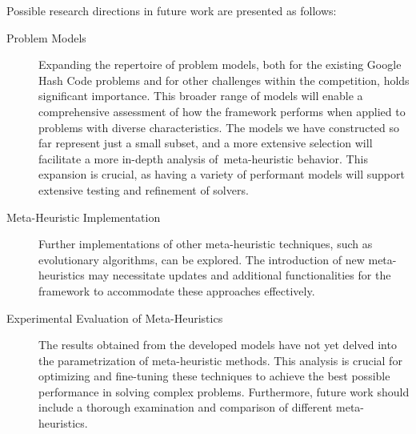 Possible research directions in future work are presented as follows:

\begin{description}
  \item[Problem Models] Expanding the repertoire of problem models, both for
    the existing Google Hash Code problems and for other challenges within the
    competition, holds significant importance. This broader range of models will
    enable a comprehensive assessment of how the framework performs when applied
    to problems with diverse characteristics. The models we have constructed so far
    represent just a small subset, and a more extensive selection will facilitate
    a more in-depth analysis of~\acrshort{meta-heuristic} behavior. This expansion is
    crucial, as having a variety of performant models will support extensive
    testing and refinement of solvers.

  \item[Meta-Heuristic Implementation] Further implementations of other
    meta-heuristic techniques, such as evolutionary algorithms, can be
    explored. The introduction of new meta-heuristics may necessitate updates
    and additional functionalities for the framework to accommodate these approaches effectively.

  \item[Experimental Evaluation of Meta-Heuristics] The results obtained from the
    developed models have not yet delved into the parametrization of meta-heuristic
    methods. This analysis is crucial for optimizing and fine-tuning these
    techniques to achieve the best possible performance in solving complex problems.
    Furthermore, future work should include a thorough examination and comparison
    of different  meta-heuristics.
\end{description}